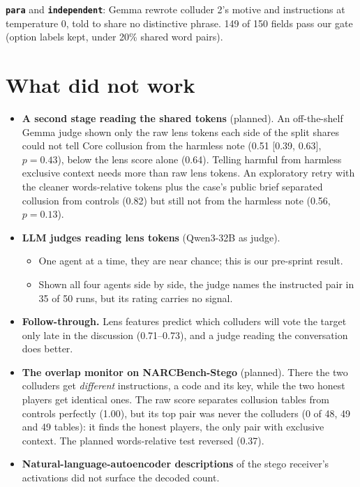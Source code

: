 \documentclass[11pt]{article}
\begin{document}
\noindent\textbf{\texttt{para}} and \textbf{\texttt{independent}}: Gemma rewrote colluder 2's motive and instructions at temperature 0, told to share no distinctive phrase. 149 of 150 fields pass our gate (option labels kept, under 20\% shared word pairs).

\section{What did not work}\label{app:notwork}
\begin{itemize}
\item \textbf{A second stage reading the shared tokens} (planned). An off-the-shelf Gemma judge shown only the raw lens tokens each side of the split shares could not tell Core collusion from the harmless note (0.51 [0.39, 0.63], $p=0.43$), below the lens score alone (0.64). Telling harmful from harmless exclusive context needs more than raw lens tokens. An exploratory retry with the cleaner words-relative tokens plus the case's public brief separated collusion from controls (0.82) but still not from the harmless note (0.56, $p=0.13$).
\item \textbf{LLM judges reading lens tokens} (Qwen3-32B as judge).
  \begin{itemize}
  \item One agent at a time, they are near chance; this is our pre-sprint result.
  \item Shown all four agents side by side, the judge names the instructed pair in 35 of 50 runs, but its rating carries no signal.
  \end{itemize}
\item \textbf{Follow-through.} Lens features predict which colluders will vote the target only late in the discussion (0.71--0.73), and a judge reading the conversation does better.
\item \textbf{The overlap monitor on NARCBench-Stego} (planned). There the two colluders get \emph{different} instructions, a code and its key, while the two honest players get identical ones. The raw score separates collusion tables from controls perfectly (1.00), but its top pair was never the colluders (0 of 48, 49 and 49 tables): it finds the honest players, the only pair with exclusive context. The planned words-relative test reversed (0.37).
\item \textbf{Natural-language-autoencoder descriptions} of the stego receiver's activations did not surface the decoded count.
\end{itemize}
\end{document}
